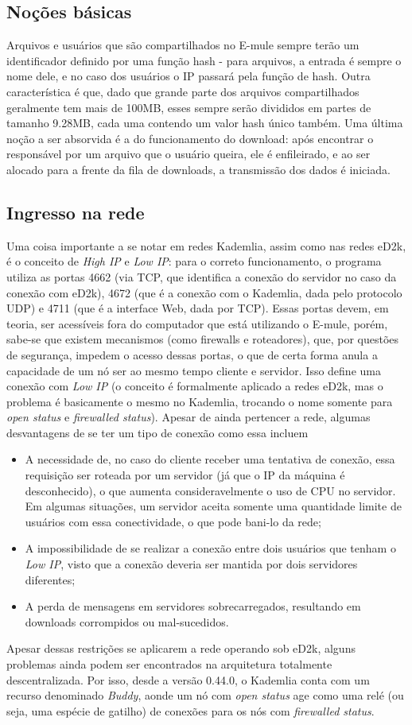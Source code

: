 \documentclass[a4paper]{article}
\begin{document}
	\subsection{Noções básicas}
		Arquivos e usuários que são compartilhados no E-mule sempre terão um identificador definido por uma função hash - para 
arquivos, a entrada é sempre o nome dele, e no caso dos usuários o IP passará pela função de hash. Outra característica é que, dado que 
grande parte dos arquivos compartilhados geralmente tem mais de 100MB, esses sempre serão divididos em partes de tamanho 9.28MB, cada uma 
contendo um valor hash único também. Uma última noção a ser absorvida é a do funcionamento do download: após encontrar o responsável por 
um arquivo que o usuário queira, ele é enfileirado, e ao ser alocado para a frente da fila de downloads, a transmissão dos dados é 
iniciada.
	\subsection{Ingresso na rede}
	Uma coisa importante a se notar em redes Kademlia, assim como nas redes eD2k, é o conceito de \textit{High IP} e \textit{Low IP}: 
para o correto funcionamento, o programa utiliza as portas 4662 (via TCP, que identifica a conexão do servidor no caso da conexão com 
eD2k), 4672 (que é a conexão com o Kademlia, dada pelo protocolo UDP) e 4711 (que é a interface Web, dada por TCP). Essas portas devem, em 
teoria, ser acessíveis fora do computador que está utilizando o E-mule, porém, sabe-se que existem mecanismos (como firewalls e 
roteadores), que, por questões de segurança, impedem o acesso dessas portas, o que de certa forma anula a capacidade de um nó ser ao mesmo 
tempo cliente e servidor. Isso define uma conexão com \textit{Low IP} (o conceito é formalmente aplicado a redes eD2k, mas o problema é 
basicamente o mesmo no Kademlia, trocando o nome somente para \textit{open status} e \textit{firewalled status}). Apesar de ainda 
pertencer a rede, algumas desvantagens de se ter um tipo de conexão como essa incluem
	\begin{itemize}
		\item A necessidade de, no caso do cliente receber uma tentativa de conexão, essa requisição ser roteada por um servidor 
(já que o IP da máquina é desconhecido), o que aumenta consideravelmente o uso de CPU no servidor. Em algumas situações, um servidor 
aceita somente uma quantidade limite de usuários com essa conectividade, o que pode bani-lo da rede;
		\item A impossibilidade de se realizar a conexão entre dois usuários que tenham o \textit{Low IP}, visto que a 
conexão deveria ser mantida por dois servidores diferentes;
		\item A perda de mensagens em servidores sobrecarregados, resultando em downloads corrompidos ou mal-sucedidos.
	\end{itemize}
	Apesar dessas restrições se aplicarem a rede operando sob eD2k, alguns problemas ainda podem ser encontrados na arquitetura 
totalmente descentralizada. Por isso, desde a versão 0.44.0, o Kademlia conta com um recurso denominado \textit{Buddy}, aonde um nó com 
\textit{open status} age como uma relé (ou seja, uma espécie de gatilho) de conexões para os nós com \textit{firewalled status}.
\end{document}
